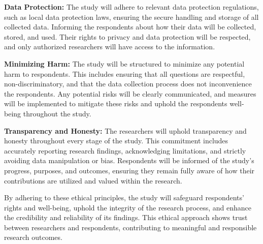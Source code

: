 	\textbf{Data Protection:} The study will adhere to relevant data protection regulations, such as local data protection laws, ensuring the secure handling and storage of all collected data. Informing the respondents about how their data will be collected, stored, and used. Their rights to privacy and data protection will be respected, and only authorized researchers will have access to the information.
	
	\textbf{Minimizing Harm:} The study will be structured to minimize any potential harm to respondents. This includes ensuring that all questions are respectful, non-discriminatory, and that the data collection process does not inconvenience the respondents. Any potential risks will be clearly communicated, and measures will be implemented to mitigate these risks and uphold the respondents well-being throughout the study.
	
	\textbf{Transparency and Honesty: } The researchers will uphold transparency and honesty throughout every stage of the study. This commitment includes accurately reporting research findings, acknowledging limitations, and strictly avoiding data manipulation or bias. Respondents will be informed of the study's progress, purposes, and outcomes, ensuring they remain fully aware of how their contributions are utilized and valued within the research.
	
	By adhering to these ethical principles, the study will safeguard respondents' rights and well-being, uphold the integrity of the research process, and enhance the credibility and reliability of its findings. This ethical approach shows trust between researchers and respondents, contributing to meaningful and responsible research outcomes.
